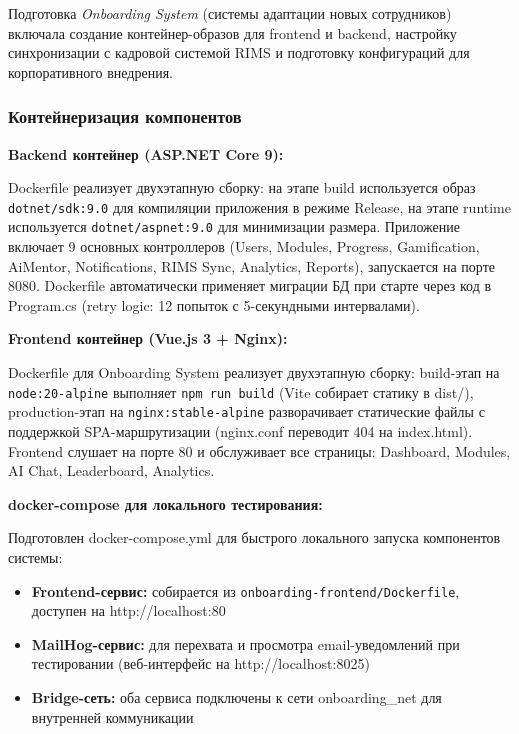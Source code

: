 
Подготовка \emph{Onboarding System} (системы адаптации новых сотрудников) включала создание контейнер-образов для frontend и backend, настройку синхронизации с кадровой системой RIMS и подготовку конфигураций для корпоративного внедрения.

\subsubsection*{Контейнеризация компонентов}

\textbf{Backend контейнер (ASP.NET Core 9):}

Dockerfile реализует двухэтапную сборку: на этапе build используется образ \texttt{dotnet/sdk:9.0} для компиляции приложения в режиме Release, на этапе runtime используется \texttt{dotnet/aspnet:9.0} для минимизации размера. Приложение включает 9 основных контроллеров (Users, Modules, Progress, Gamification, AiMentor, Notifications, RIMS Sync, Analytics, Reports), запускается на порте 8080. Dockerfile автоматически применяет миграции БД при старте через код в Program.cs (retry logic: 12 попыток с 5-секундными интервалами).

\textbf{Frontend контейнер (Vue.js 3 + Nginx):}

Dockerfile для Onboarding System реализует двухэтапную сборку: build-этап на \texttt{node:20-alpine} выполняет \texttt{npm run build} (Vite собирает статику в dist/), production-этап на \texttt{nginx:stable-alpine} разворачивает статические файлы с поддержкой SPA-маршрутизации (nginx.conf переводит 404 на index.html). Frontend слушает на порте 80 и обслуживает все страницы: Dashboard, Modules, AI Chat, Leaderboard, Analytics.

\textbf{docker-compose для локального тестирования:}

Подготовлен docker-compose.yml для быстрого локального запуска компонентов системы:

\begin{itemize}
	\item \textbf{Frontend-сервис:} собирается из \texttt{onboarding-frontend/Dockerfile}, доступен на http://localhost:80
	\item \textbf{MailHog-сервис:} для перехвата и просмотра email-уведомлений при тестировании (веб-интерфейс на http://localhost:8025)
	\item \textbf{Bridge-сеть:} оба сервиса подключены к сети onboarding\_net для внутренней коммуникации
\end{itemize}

